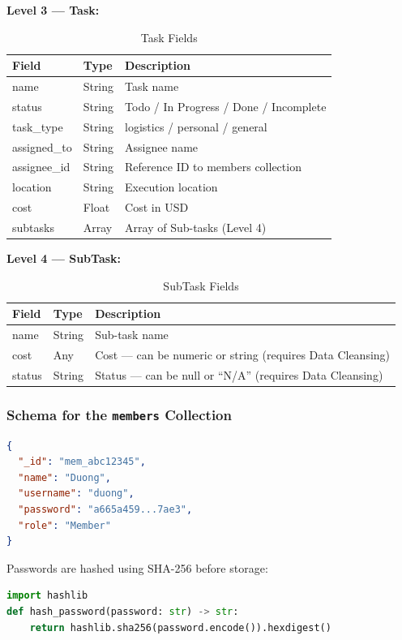 \documentclass[a4paper,12pt]{article}
\begin{document}
\textbf{Level 3 --- Task:}
\begin{table}[H]
\centering
\begin{tabular}{|l|l|p{6cm}|}
\hline
\textbf{Field} & \textbf{Type} & \textbf{Description} \\ \hline
name & String & Task name \\ \hline
status & String & Todo / In Progress / Done / Incomplete \\ \hline
task\_type & String & logistics / personal / general \\ \hline
assigned\_to & String & Assignee name \\ \hline
assignee\_id & String & Reference ID to members collection \\ \hline
location & String & Execution location \\ \hline
cost & Float & Cost in USD \\ \hline
subtasks & Array & Array of Sub-tasks (Level 4) \\ \hline
\end{tabular}
\caption{Task Fields}
\end{table}

\textbf{Level 4 --- SubTask:}
\begin{table}[H]
\centering
\begin{tabular}{|l|l|p{6.5cm}|}
\hline
\textbf{Field} & \textbf{Type} & \textbf{Description} \\ \hline
name & String & Sub-task name \\ \hline
cost & Any & Cost --- can be numeric or string (requires Data Cleansing) \\ \hline
status & String & Status --- can be null or ``N/A'' (requires Data Cleansing) \\ \hline
\end{tabular}
\caption{SubTask Fields}
\end{table}

\subsubsection{Schema for the \texttt{members} Collection}
\begin{lstlisting}[language=json, caption=Document structure in the members collection]
{
  "_id": "mem_abc12345",
  "name": "Duong",
  "username": "duong",
  "password": "a665a459...7ae3",
  "role": "Member"
}
\end{lstlisting}

Passwords are hashed using SHA-256 before storage:
\begin{lstlisting}[language=Python, caption=Password hashing function]
import hashlib
def hash_password(password: str) -> str:
    return hashlib.sha256(password.encode()).hexdigest()
\end{lstlisting}
\end{document}
